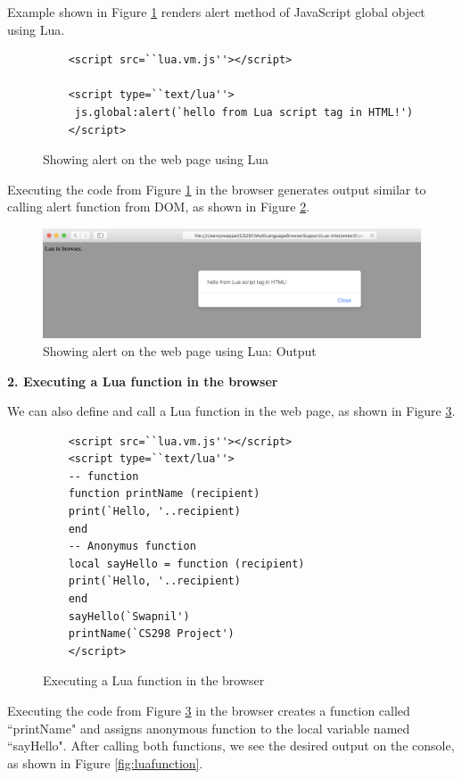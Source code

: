Example shown in Figure \ref{fig:luaalertcode} renders alert method of JavaScript global object using Lua.  

\begin{figure}[h]
	\begin{lstlisting}
	<script src=``lua.vm.js''></script>
	
	<script type=``text/lua''>
	 js.global:alert(`hello from Lua script tag in HTML!')
	</script>
	\end{lstlisting}
	\caption{Showing alert on the web page using Lua}
	\label{fig:luaalertcode}
\end{figure}


Executing the code from Figure \ref{fig:luaalertcode} in the browser generates output similar to calling alert function from DOM, as shown in Figure \ref{fig:luaalert}.

\begin{figure}[H]
	\begin{center}
		\includegraphics[width=\linewidth]{./images/lua-alert.png}
	\end{center}
	\caption{Showing alert on the web page using Lua: Output}
	\label{fig:luaalert}
\end{figure}

\textbf{2. Executing a Lua function in the browser}

We can also define and call a Lua function in the web page, as shown in Figure \ref{fig:luafunctioncode}.

\begin{figure}[h]
	\begin{lstlisting} 	
	<script src=``lua.vm.js''></script>
	<script type=``text/lua''>
	-- function
	function printName (recipient)
	print(`Hello, '..recipient)
	end
	-- Anonymus function
	local sayHello = function (recipient)
	print(`Hello, '..recipient)
	end
	sayHello(`Swapnil')
	printName(`CS298 Project')
	</script>
	\end{lstlisting}
	\caption{Executing a Lua function in the browser}
	\label{fig:luafunctioncode}
\end{figure}


Executing the code from Figure \ref{fig:luafunctioncode} in the browser creates a function called ``printName" and assigns anonymous function to the local variable named ``sayHello". After calling both functions, we see the desired output on the console, as shown in Figure \ref{fig:luafunction}.

